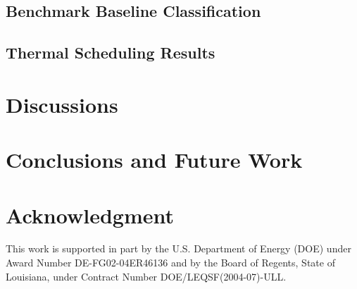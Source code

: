 \documentclass[acmtaco]{acmtrans2m}
\begin{document}
\subsection{Benchmark Baseline Classification}
\label{sec:baseline}

\subsection{Thermal Scheduling Results}
\label{sec:thresults}

\section{Discussions}
\label{sec:discussions}

\section{Conclusions and Future Work}
\label{sec:conclusions}



\section*{Acknowledgment}
\label{sec:acknowledgement}
This work is supported in part by the U.S. Department of Energy
(DOE) under Award Number DE-FG02-04ER46136 and by the Board of Regents,
State of Louisiana, under Contract Number DOE/LEQSF(2004-07)-ULL.
\label{sec:references}


\end{document}
